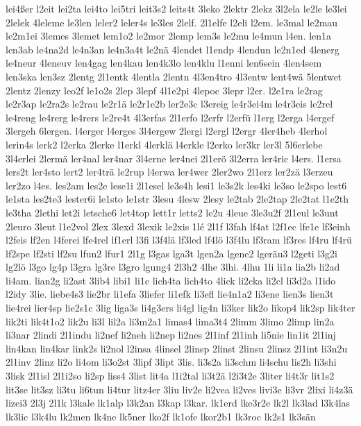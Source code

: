 {lei4ßer
l2eit
lei2ta
lei4to
lei5tri
leit3s2
leits4t
3leko
2lektr
2lekz
3l2ela
le2le
le3lei
2lelek
4leleme
le3len
leler2
leler4s
le3les
2lelf.
2l1elfe
l2eli
l2em.
le3mal
le2mau
le2m1ei
3lemes
3lemet
lem1o2
le2mor
2lemp
lem3s
le2mu
le4mun
l4en.
len1a
len3ab
le4na2d
le4n3an
le4n3a4t
le2nä
4lendet
l1endp
4lendun
le2n1ed
4lenerg
le4neur
4leneuv
len4gag
len4kau
len4k3lo
len4klu
l1enni
len6sein
4len4sem
len3ska
len3sz
2lentg
2l1entk
4lentla
2lentn
4l3en4tro
4l3entw
lent4wä
5lentwet
2lentz
2lenzy
leo2f
le1o2s
2lep
3lepf
4l1e2pi
4lepoc
3lepr
l2er.
l2e1ra
le2rag
le2r3ap
le2ra2s
le2rau
le2r1ä
le2r1e2b
ler2e3c
l3ereig
le4r3ei4m
le4r3eis
le2rel
le4reng
le4rerg
le4rers
le2re4t
4l3erfas
2l1erfo
l2erfr
l2erfü
l1erg
l2erga
l4ergef
3lergeh
6lergen.
l4erger
l4erges
3l4ergew
2lergi
l2ergl
l2ergr
4ler4heb
4lerhol
lerin4s
lerk2
l2erka
2lerke
l1erkl
4lerklä
l4erkle
l2erko
ler3kr
ler3l
5l6erlebe
3l4erlei
2lermä
ler4nal
ler4nar
3l4erne
ler4nei
2l1erö
3l2erra
ler4ric
l4ers.
l1ersa
lers2t
ler4sto
lert2
ler4trä
le2rup
l4erwa
ler4wer
2ler2wo
2l1erz
ler2zä
l3erzeu
ler2zo
l4es.
les2am
les2e
lese1i
2l1esel
le3s4h
lesi1
le3s2k
les4ki
le3so
le2spo
lest6
le1sta
les2te3
lester6i
le1sto
le1str
3lesu
4lesw
2lesy
le2tab
2le2tap
2le2tat
l1e2th
le3tha
2lethi
let2i
letsche6
let4top
lett1r
letts2
le2u
4leue
3le3u2f
2l1eul
le3unt
2leuro
3leut
l1e2vol
2lex
3lexd
3lexik
le2xis
1lé
2l1f
l3fah
lf4at
l2f1ec
lfe1e
lf3einh
l2feis
lf2en
l4ferei
lfe4rel
lf1erl
l3fi
l3f4lä
lf3led
lf4lö
l3f4lu
lf3ram
lf3res
lf4ru
lf4rü
lf2spe
lf2sti
lf2su
lfun2
lfur1
2l1g
l3gas
lga3t
lgen2a
lgene2
lgeräu3
l2geti
l3g2i
lg2lö
l3go
lg4p
l3gra
lg3re
l3gro
lgung4
2l3h2
4lhe
3lhi.
4lhu
1li
li1a
lia2b
li2ad
li4am.
lian2g
li2ast
3lib4
libi1
li1c
lich4ta
lich4to
4lick
li2cka
li2cl
li3d2a
l1ido
l2idy
3lie.
liebe4s3
lie2br
li1efa
3liefer
li1efk
li3efl
lie4n1a2
li3ene
lien3s
lien3t
lie4rei
lier4sp
lie2s1c
3lig
liga3s
li4g3ers
li4gl
lig4n
li3ker
lik2o
likop4
lik2sp
lik4ter
lik2ti
lik4t1o2
lik2u
li3l
lil2a
li3m2a1
limas4
lima3t4
2limm
3limo
2limp
lin2a
li3nar
2lindi
2l1indu
li2nef
li2neh
li2nep
li2nes
2l1inf
2l1inh
li5nie
lin1it
2l1inj
lin4kan
lin4kar
link2s
li2nol
l2insa
4linsel
2linsp
2linst
2linsu
2linsz
2l1int
li3n2u
2l1inv
2linz
li2o
li4om
li3o2st
3lipf
3lipt
3lis.
li3s2a
li3schm
li4schu
lis2h
li3shi
3lisk
2l1isl
2l1i2so
li2sp
liss4
3list
lit4a
l1i2tal
li3t2ä
l2i3t2e
3liter
li4t3r
lit1s2
lit3se
lit3sz
li3tu
li6tun
li4tur
litz4er
3liu
liv2e
li2vea
li2ves
livi3e
li3vr
2lixi
li4z3ä
lizei3
2l3j
2l1k
l3kale
lk1alp
l3k2an
l3kap
l3kar.
lk1erd
lke3r2e
lk2l
lk3lad
l3k4las
lk3lic
l3k4lu
lk2men
lk4ne
lk5ner
lko2f
lk1ofe
lkor2b1
lk3roc
lk2s1
lk3sän
}
